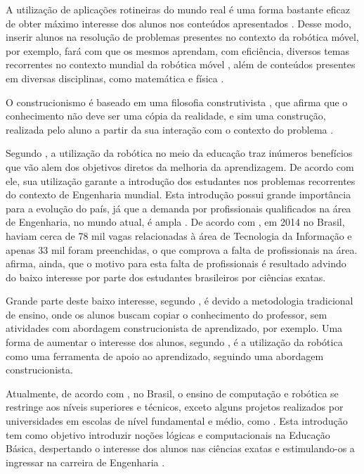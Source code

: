	A utilização de aplicações rotineiras do mundo real é uma forma bastante eficaz de obter máximo interesse dos alunos nos conteúdos apresentados \cite{construcionismoPapert}. Desse modo, inserir alunos na resolução de problemas presentes no contexto da robótica móvel, por exemplo, fará com que os mesmos aprendam, com eficiência, diversos temas recorrentes no contexto mundial da robótica móvel \cite{simpleRobotsIntroductionEng}, além de conteúdos presentes em diversas disciplinas, como matemática e física \cite{roboticaEducacionalAulasMatematica}.

	O construcionismo é baseado em uma filosofia construtivista \cite{construcionismoPapert}, que afirma que o conhecimento não deve ser uma cópia da realidade, e sim uma construção, realizada pelo aluno a partir da sua interação com o contexto do problema \cite{oQueEConstrutivismo}.


Segundo \cite{simpleRobotsIntroductionEng}, a utilização da robótica no meio da educação traz inúmeros benefícios que vão alem dos objetivos diretos da melhoria da aprendizagem. De acordo com ele, sua utilização garante a introdução dos estudantes nos problemas recorrentes do contexto de Engenharia mundial. Esta introdução possui grande importância para a evolução do país, já que a demanda por profissionais qualificados na área de Engenharia, no mundo atual, é ampla \cite{simpleRobotsIntroductionEng}. De acordo com \cite{analiseFerramentaEnsinoComputacao}, em 2014 no Brasil, haviam cerca de 78 mil vagas relacionadas à área de Tecnologia da Informação e apenas 33 mil foram preenchidas, o que comprova a falta de profissionais na área.  \cite{analiseFerramentaEnsinoComputacao} afirma, ainda, que o motivo para esta falta de profissionais é resultado advindo do baixo interesse por parte dos estudantes brasileiros por ciências exatas.

Grande parte deste baixo interesse, segundo \cite{oQueEConstrutivismo}, é devido a metodologia tradicional de ensino, onde os alunos buscam copiar o conhecimento do professor, sem atividades com abordagem construcionista de aprendizado, por exemplo. Uma forma de aumentar o interesse dos alunos, segundo \cite{roboticaEducacionalAulasMatematica}, é a utilização da robótica como uma ferramenta de apoio ao aprendizado, seguindo uma abordagem construcionista.

Atualmente, de acordo com \cite{analiseFerramentaEnsinoComputacao}, no Brasil, o ensino de computação e robótica se restringe aos níveis superiores e técnicos, exceto alguns projetos realizados por universidades em escolas de nível fundamental e médio, como \cite{projetoRoboticaMauricio}. Esta introdução tem como objetivo introduzir noções lógicas e computacionais na Educação Básica, despertando o interesse dos alunos nas ciências exatas e estimulando-os a ingressar na carreira de Engenharia \cite{analiseFerramentaEnsinoComputacao}.

